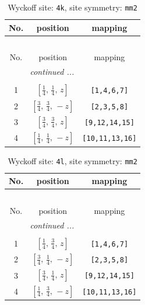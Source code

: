 \documentclass[fleqn,8pt]{jsarticle}
\begin{document}
\renewcommand{\arraystretch}{1.2}
\begin{longtable}{ccc}
\caption{Wyckoff site: {\tt 4k}, site symmetry: {\tt mm2}}
 \\
 \hline \hline
No. & position & mapping \\ \hline \endfirsthead

\multicolumn{2}{l}{\tablename\ \thetable{}} \\
 \hline \hline
No. & position & mapping \\ \hline \endhead

 \hline \hline
\multicolumn{2}{r}{\footnotesize\it continued ...} \\ \endfoot

 \hline \hline
\multicolumn{2}{r}{} \\ \endlastfoot

1 & $\left[ \frac{1}{4},\, \frac{1}{4},\, z \right]$ & {\tt [1,4,6,7]} \\ \hline
2 & $\left[ \frac{3}{4},\, \frac{3}{4},\, - z \right]$ & {\tt [2,3,5,8]} \\ \hline
3 & $\left[ \frac{3}{4},\, \frac{3}{4},\, z \right]$ & {\tt [9,12,14,15]} \\ \hline
4 & $\left[ \frac{1}{4},\, \frac{1}{4},\, - z \right]$ & {\tt [10,11,13,16]} \\
\end{longtable}
\renewcommand{\arraystretch}{1.2}
\begin{longtable}{ccc}
\caption{Wyckoff site: {\tt 4l}, site symmetry: {\tt mm2}}
 \\
 \hline \hline
No. & position & mapping \\ \hline \endfirsthead

\multicolumn{2}{l}{\tablename\ \thetable{}} \\
 \hline \hline
No. & position & mapping \\ \hline \endhead

 \hline \hline
\multicolumn{2}{r}{\footnotesize\it continued ...} \\ \endfoot

 \hline \hline
\multicolumn{2}{r}{} \\ \endlastfoot

1 & $\left[ \frac{1}{4},\, \frac{3}{4},\, z \right]$ & {\tt [1,4,6,7]} \\ \hline
2 & $\left[ \frac{3}{4},\, \frac{1}{4},\, - z \right]$ & {\tt [2,3,5,8]} \\ \hline
3 & $\left[ \frac{3}{4},\, \frac{1}{4},\, z \right]$ & {\tt [9,12,14,15]} \\ \hline
4 & $\left[ \frac{1}{4},\, \frac{3}{4},\, - z \right]$ & {\tt [10,11,13,16]} \\
\end{longtable}
\end{document}
